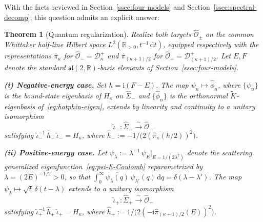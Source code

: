 \documentclass[11pt]{article}
\theoremstyle{plain}
\newtheorem{theorem}{Theorem}
\theoremstyle{definition}
\theoremstyle{remark}
\newcommand{\R}{\mathbb{R}}
\newcommand{\sltwo}{\mathfrak{sl}(2,\R)}
\newcommand{\Kt}{\widetilde{K}}
\newcommand{\Sigmah}{\widehat{\Sigma}}
\newcommand{\OOh}{\widehat{\mathcal{O}}}
\newcommand{\D}{\mathcal{D}}
\newcommand{\ii}{\mathrm{i}}
\begin{document}
With the facts reviewed in Section~\ref{ssec:four-models} and Section~\ref{ssec:spectral-decomp}, this question admits an explicit answer:

\begin{theorem}[Quantum regularization]\label{thm:iotahat}
Realize both targets $\OOh_{\pm}$ on the common Whittaker half-line Hilbert space
$L^{2}(\R_{>0},t^{-1}\,\mathrm{d}t)$, equipped respectively with the representations
$\hat\pi_{\kappa}$ for $\OOh_{-}=\D^{+}_{\kappa}$ and $\hat\pi_{(\kappa+1)/2}$
for $\OOh_{+}=\D^{+}_{(\kappa+1)/2}$. Let $E,F$ denote the standard
$\sltwo$-basis elements of Section~\ref{ssec:four-models}.

\smallskip\noindent\textbf{(i) Negative-energy case.}
Set $h=\ii(F-E)$. The map $\psi_{n}\mapsto\hat\phi_{n}$, where
$\{\psi_{n}\}$ is the bound-state eigenbasis of $H_{\kappa}$ on $\Sigmah_{-}$
and $\{\hat\phi_{n}\}$ is the orthonormal $\Kt$-eigenbasis
of~\eqref{eq:hatphin-eigen}, extends by linearity and continuity to a unitary
isomorphism
\[
  \hat\iota_{-}\colon\Sigmah_{-}\xrightarrow{\;\sim\;}\OOh_{-}
\]
satisfying $\hat\iota_{-}^{-1}\,\hat h_{-}\,\hat\iota_{-}=H_{\kappa}$, where
$\hat h_{-}:=-1/\bigl(2(\hat\pi_{\kappa}(h/2))^{2}\bigr)$.

\smallskip\noindent\textbf{(ii) Positive-energy case.}
Let $\psi_{\lambda}:=\lambda^{-1}\,\psi_{E}\big|_{E=1/(2\lambda^{2})}$ denote the
scattering generalized eigenfunction~\eqref{eq:psi-E-Coulomb} reparametrized by
$\lambda=(2E)^{-1/2}>0$, so that
$\int_{0}^{\infty}\overline{\psi_{\lambda}(q)}\,\psi_{\lambda'}(q)\,\mathrm{d}q
=\delta(\lambda-\lambda')$. The map $\psi_{\lambda}\mapsto\sqrt{t}\,\delta(t-\lambda)$
extends to a unitary isomorphism
\[
  \hat\iota_{+}\colon\Sigmah_{+}\xrightarrow{\;\sim\;}\OOh_{+}
\]
satisfying $\hat\iota_{+}^{-1}\,\hat h_{+}\,\hat\iota_{+}=H_{\kappa}$, where
$\hat h_{+}:=1/\bigl(2(-\ii\hat\pi_{(\kappa+1)/2}(E))^{2}\bigr)$.
\end{theorem}
\end{document}

